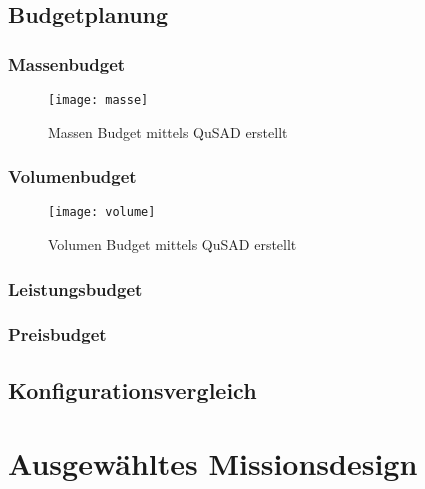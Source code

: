 				\subsection{Budgetplanung}
				
						\subsubsection{Massenbudget}
								
										\begin{figure}[h]
											\centering
												\texttt{[image: masse]}
											\caption{Massen Budget mittels QuSAD erstellt}
											\label{fig:masse}
										\end{figure}
										
						\subsubsection{Volumenbudget}
								
										\begin{figure}[h]
											\centering
												\texttt{[image: volume]}
											\caption{Volumen Budget mittels QuSAD erstellt }
											\label{fig:volume}
										\end{figure}
								
						\subsubsection{Leistungsbudget}
						\subsubsection{Preisbudget}
				
				\subsection{Konfigurationsvergleich}
		
		\section{	Ausgewähltes Missionsdesign}
				
